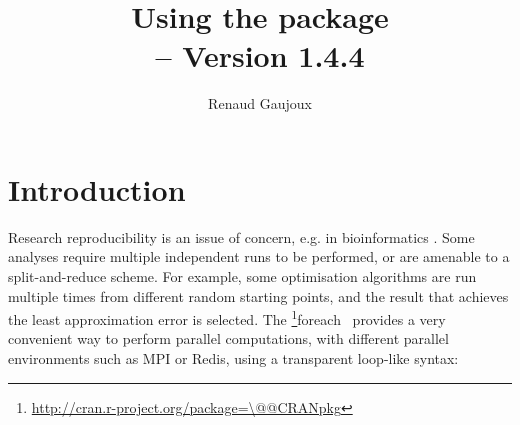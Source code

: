 \documentclass[a4paper,12pt]{article}\usepackage{graphicx, color}
\title{Using the \code{doRNG} package\\
{\small \Rpkg{doRNG} -- Version 1.4.4}}
\author{Renaud Gaujoux}
\makeatletter
\newcommand{\pkgname}[1]{\textit{#1}\xspace}
\newcommand{\CRANurl}[1]{\url{http://cran.r-project.org/package=#1}}
\def\CRANpkg{\@ifstar\@CRANpkg\@@CRANpkg}
\def\@CRANpkg#1{\href{http://cran.r-project.org/package=#1}{\pkgname{#1}}\footnote{\CRANurl{#1}}}
\def\@@CRANpkg#1{\href{http://cran.r-project.org/package=#1}{\pkgname{#1}} package\footnote{\CRANurl{#1}}}
\newcommand{\citeCRANpkg}[1]{\CRANpkg{#1}~\cite{#1}}
\makeatother
\begin{document}
\maketitle

\tableofcontents

\section*{Introduction}

Research reproducibility is an issue of concern, e.g. in bioinformatics
\cite{Hothorn2011,Stodden2011,Ioannidis2008}.
Some analyses require multiple independent runs to be performed, or are amenable to a split-and-reduce scheme.
For example, some optimisation algorithms are run multiple times from different
random starting points, and the result that achieves the least approximation error is selected.
The \citeCRANpkg{foreach} provides a very convenient way to perform parallel computations, with different parallel environments such as MPI or Redis, using a transparent loop-like syntax:
\end{document}
